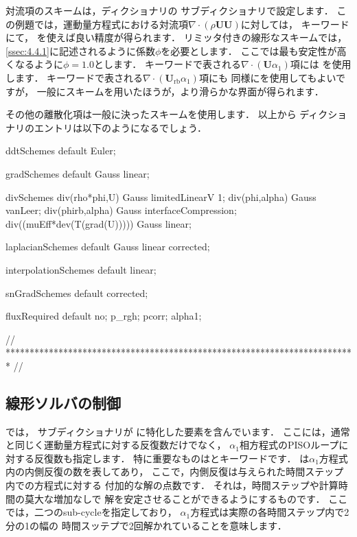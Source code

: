 対流項のスキームは，ディクショナリの
サブディクショナリで設定します．
この例題では，運動量方程式における対流項$\nabla \cdot (\rho\bm{U}\bm{U})$に対しては，
キーワードにて，
を使えば良い精度が得られます．
リミッタ付きの線形なスキームでは，
\autoref{ssec:4.4.1}に記述されるように係数$\phi$を必要とします．
ここでは最も安定性が高くなるように$\phi = 1.0$とします．
キーワードで表される$\nabla \cdot (\bm{U}\alpha_{1})$項には
を使用します．
キーワードで表される$\nabla \cdot (\bm{U}_{\mathrm{rb}}\alpha_{1})$項にも
同様にを使用してもよいですが，
一般にスキームを用いたほうが，より滑らかな界面が得られます．

その他の離散化項は一般に決ったスキームを使用します．
以上から
%
%
ディクショナリのエントリは以下のようになるでしょう．
\begin{OFverbatim}[file, linenum=17]

ddtSchemes
{
    default         Euler;
}

gradSchemes
{
    default         Gauss linear;
}

divSchemes
{
    div(rho*phi,U)  Gauss limitedLinearV 1;
    div(phi,alpha)  Gauss vanLeer;
    div(phirb,alpha) Gauss interfaceCompression;
    div((muEff*dev(T(grad(U))))) Gauss linear;
}

laplacianSchemes
{
    default         Gauss linear corrected;
}

interpolationSchemes
{
    default         linear;
}

snGradSchemes
{
    default         corrected;
}

fluxRequired
{
    default         no;
    p_rgh;
    pcorr;
    alpha1;
}


// ************************************************************************* //
\end{OFverbatim}


\subsection{線形ソルバの制御}
\label{ssec:2.3.7}
では，
サブディクショナリが
に特化した要素を含んでいます．
ここには，通常と同じく運動量方程式に対する反復数だけでなく，
$\alpha_{1}$相方程式のPISOループに対する反復数も指定します．
特に重要なものはとキーワードです．
%
%
は$\alpha_{1}$方程式内の内側反復の数を表してあり，
ここで，内側反復は与えられた時間ステップ内での方程式に対する
付加的な解の点数です．
それは，時間ステップや計算時間の莫大な増加なしで
解を安定させることができるようにするものです．
ここでは，二つのsub-cycleを指定しており，
$\alpha_{1}$方程式は実際の各時間ステップ内で2分の1の幅の
時間スッテプで2回解かれていることを意味します．

